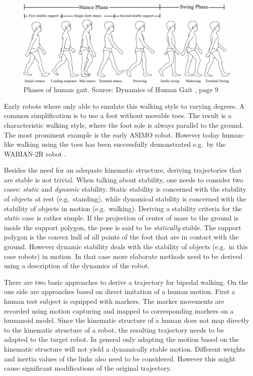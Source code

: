 \documentclass[english,ngerman]{KITreprt}
\newcommand{\name}[1]{\textsc{#1}}
\begin{document}
\begin{figure}[tb]
\vspace*{-1em}
\includegraphics[width=\textwidth]{images/human_gait.png}
\caption{Phases of human gait. Source: Dynamics of Human Gait \cite{vaughan1992dynamics}, page 9}
\label{img:human-gait}
\end{figure}

Early robots where only able to emulate this walking style to varying
degrees. A common simplification is to use a foot without movable toes.
The result is a characteristic walking style, where the foot sole is
always parallel to the ground. The most prominent example is the early
\name{ASIMO} robot. However today human-like walking using the toes has
been successfully demonstrated e.g.~by the \name{WABIAN-2R} robot
\cite{ogura2006human}.

Besides the need for an adequate kinematic structure, deriving
trajectories that are stable is not trivial. When talking about
stability, one needs to consider two cases: \emph{static} and
\emph{dynamic} stability. Static stability is concerned with the
stability of objects at rest (e.g.~standing), while dynamical stability
is concerned with the stability of objects in motion (e.g.~walking).
Deriving a stability criteria for the \emph{static} case is rather
simple. If the projection of center of mass to the ground is inside the
support polygon, the pose is said to be \emph{statically} stable. The
support polygon is the convex hull of all points of the foot that are in
contact with the ground. However dynamic stability deals with the
stability of objects (e.g.~in this case robots) in motion. In that case
more elaborate methods need to be derived using a description of the
dynamics of the robot.

There are two basic approaches to derive a trajectory for bipedal
walking. On the one side are approaches based on direct imitation of a
human motion. First a human test subject is equipped with markers. The
marker movements are recorded using motion capturing and mapped to
corresponding markers on a humanoid model. Since the kinematic structure
of a human does not map directly to the kinematic structure of a robot,
the resulting trajectory needs to be adapted to the target robot. In
general only adapting the motion based on the kinematic structure will
not yield a dynamically stable motion. Different weights and inertia
values of the links also need to be considered. However this might cause
significant modifications of the original trajectory.
\end{document}
